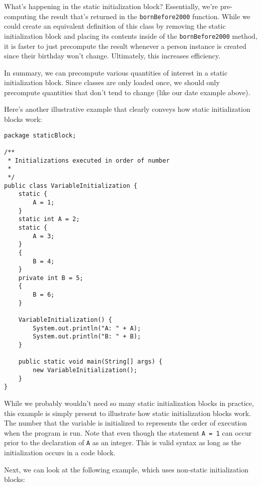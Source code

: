 What's happening in the static initialization block? Essentially, we're pre-computing the result that's returned in the \verb!bornBefore2000! function. While we could create an equivalent definition of this class by removing the static initialization block and placing its contents inside of the \verb!bornBefore2000! method, it is faster to just precompute the result whenever a person instance is created since their birthday won't change. Ultimately, this increases efficiency. 

In summary, we can precompute various quantities of interest in a static initialization block. Since classes are only loaded once, we should only precompute quantities that don't tend to change (like our date example above). 

Here's another illustrative example that clearly conveys how static initialization blocks work:

\begin{lstlisting}
package staticBlock;

/**
 * Initializations executed in order of number
 *
 */
public class VariableInitialization {
	static {
		A = 1;
	}
	static int A = 2;
	static {
		A = 3;
	}
	{
		B = 4;
	}
	private int B = 5;
	{
		B = 6;
	}

	VariableInitialization() {
		System.out.println("A: " + A);
		System.out.println("B: " + B);
	}

	public static void main(String[] args) {
		new VariableInitialization();
	}
}
\end{lstlisting}

While we probably wouldn't need so many static initialization blocks in practice, this example is simply present to illustrate how static initialization blocks work. The number that the variable is initialized to represents the order of execution when the program is run. Note that even though the statement \verb!A = 1! can occur prior to the declaration of \verb!A! as an integer. This is valid syntax as long as the initialization occurs in a code block.


Next, we can look at the following example, which uses non-static initialization blocks:

